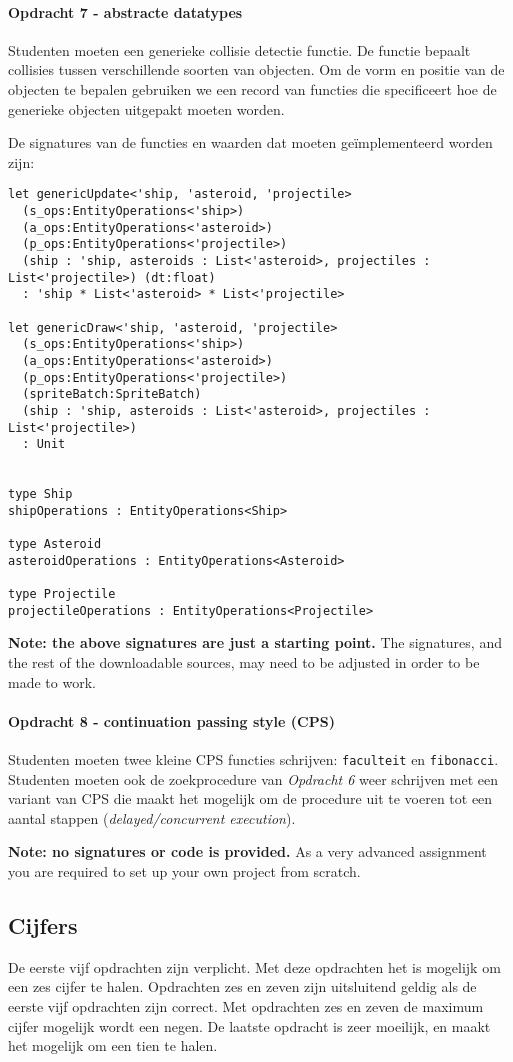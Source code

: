 			
		\paragraph{Opdracht 7 - abstracte datatypes}
			Studenten moeten een generieke collisie detectie functie. De functie bepaalt collisies tussen verschillende soorten van objecten. Om de vorm en positie van de objecten te bepalen gebruiken we een record van functies die specificeert hoe de generieke objecten uitgepakt moeten worden.
			
            De signatures van de functies en waarden dat moeten geïmplementeerd worden zijn:
			\begin{lstlisting}
let genericUpdate<'ship, 'asteroid, 'projectile>
  (s_ops:EntityOperations<'ship>)
  (a_ops:EntityOperations<'asteroid>)
  (p_ops:EntityOperations<'projectile>)
  (ship : 'ship, asteroids : List<'asteroid>, projectiles : List<'projectile>) (dt:float) 
  : 'ship * List<'asteroid> * List<'projectile>

let genericDraw<'ship, 'asteroid, 'projectile>
  (s_ops:EntityOperations<'ship>)
  (a_ops:EntityOperations<'asteroid>)
  (p_ops:EntityOperations<'projectile>)
  (spriteBatch:SpriteBatch)
  (ship : 'ship, asteroids : List<'asteroid>, projectiles : List<'projectile>) 
  : Unit


type Ship
shipOperations : EntityOperations<Ship>

type Asteroid
asteroidOperations : EntityOperations<Asteroid>

type Projectile
projectileOperations : EntityOperations<Projectile>
			\end{lstlisting}
			
			\textbf{Note: the above signatures are just a starting point.} The signatures, and the rest of the downloadable sources, may need to be adjusted in order to be made to work.


		\paragraph{Opdracht 8 - continuation passing style (CPS)}
			Studenten moeten twee kleine CPS functies schrijven: \texttt{faculteit} en \texttt{fibonacci}. Studenten moeten ook de zoekprocedure van \textit{Opdracht 6} weer schrijven met een variant van CPS die maakt het mogelijk om de procedure uit te voeren tot een aantal stappen (\textit{delayed/concurrent execution}).
			
			\textbf{Note: no signatures or code is provided.} As a very advanced assignment you are required to set up your own project from scratch.


	\subsection{Cijfers}
		De eerste vijf opdrachten zijn verplicht. Met deze opdrachten het is mogelijk om een zes cijfer te halen. Opdrachten zes en zeven zijn uitsluitend geldig als de eerste vijf opdrachten zijn correct. Met opdrachten zes en zeven de maximum cijfer mogelijk wordt een negen. De laatste opdracht is zeer moeilijk, en maakt het mogelijk om een tien te halen.
		